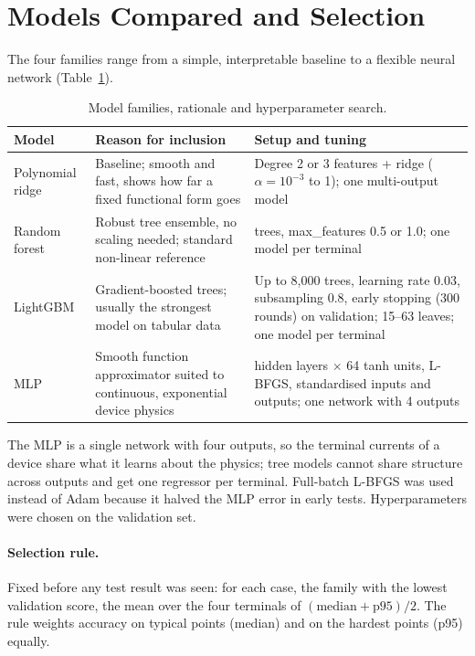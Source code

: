 \documentclass[11pt,a4paper]{article}
\begin{document}
\section{Models Compared and Selection}
The four families range from a simple, interpretable baseline to a flexible neural network
(Table~\ref{tab:models}).

\begin{table}[H]
\centering
\small
\begin{tabularx}{\linewidth}{>{\raggedright\arraybackslash}p{2.4cm}
                             >{\raggedright\arraybackslash}X
                             >{\raggedright\arraybackslash}X}
\toprule
\textbf{Model} & \textbf{Reason for inclusion} & \textbf{Setup and tuning} \\
\midrule
Polynomial ridge & Baseline; smooth and fast, shows how far a fixed functional form goes &
  Degree 2 or 3 features + ridge ($\alpha = 10^{-3}$ to 1); one multi-output model \\
Random forest & Robust tree ensemble, no scaling needed; standard non-linear reference &
  400 trees, max\_features 0.5 or 1.0; one model per terminal \\
LightGBM & Gradient-boosted trees; usually the strongest model on tabular data &
  Up to 8,000 trees, learning rate 0.03, subsampling 0.8, early stopping (300 rounds) on
  validation; 15--63 leaves; one model per terminal \\
MLP & Smooth function approximator suited to continuous, exponential device physics &
  3 hidden layers $\times$ 64 tanh units, L-BFGS, standardised inputs and outputs; one network
  with 4 outputs \\
\bottomrule
\end{tabularx}
\caption{Model families, rationale and hyperparameter search.}
\label{tab:models}
\end{table}

The MLP is a single network with four outputs, so the terminal currents of a device share what it
learns about the physics; tree models cannot share structure across outputs and get one regressor
per terminal. Full-batch L-BFGS was used instead of Adam because it halved the MLP error in early
tests. Hyperparameters were chosen on the validation set.

\paragraph{Selection rule.} Fixed before any test result was seen: for each case, the family with
the lowest validation score, the mean over the four terminals of $(\text{median} + \text{p95})/2$.
The rule weights accuracy on typical points (median) and on the hardest points (p95) equally.
\end{document}
